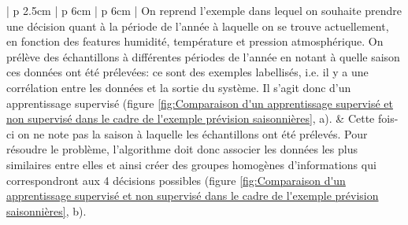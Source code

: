 \begin{table}[H]
\begin{tabular}{ | p {2.5cm} | p {6cm} | p {6cm} |}
	On reprend l'exemple dans lequel on souhaite prendre une décision quant à la période de l'année à laquelle on se trouve actuellement, en fonction des features humidité, température et pression atmosphérique. On prélève des échantillons à différentes périodes de l'année en notant à quelle saison ces données ont été prélevées: ce sont des exemples labellisés, i.e. il y a une corrélation entre les données et la sortie du système. Il s'agit donc d'un apprentissage supervisé (figure \ref{fig:Comparaison d'un apprentissage supervisé et non supervisé dans le cadre de l'exemple prévision saisonnières}, a). &
	Cette fois-ci on ne note pas la saison à laquelle les échantillons ont été prélevés. Pour résoudre le problème, l'algorithme doit donc associer les données les plus similaires entre elles et ainsi créer des groupes homogènes d'informations qui correspondront aux 4 décisions possibles (figure \ref{fig:Comparaison d'un apprentissage supervisé et non supervisé dans le cadre de l'exemple prévision saisonnières}, b). \\
	\hline
	\end{tabular}
	\caption[Comparaison des différents modèles d'apprentissage]{Comparaison de l'apprentissage supervisé et non supervisé par des exemples}
	\label {tab: Comparaison des différentes méthodes d'apprentissage}
\end{table}

